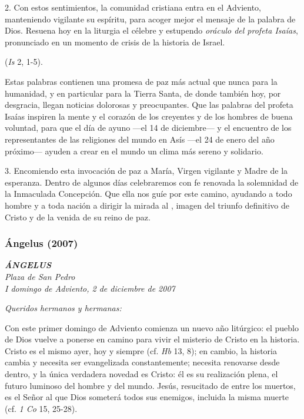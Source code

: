 2. Con estos sentimientos, la comunidad cristiana entra en el Adviento, manteniendo vigilante su espíritu, para acoger mejor el mensaje de la palabra de Dios. Resuena hoy en la liturgia el célebre y estupendo \emph{oráculo del profeta Isaías}, pronunciado en un momento de crisis de la historia de Israel.

 (\emph{Is} 2, 1-5).

Estas palabras contienen una promesa de paz más actual que nunca para la humanidad, y en particular para la Tierra Santa, de donde también hoy, por desgracia, llegan noticias dolorosas y preocupantes. Que las palabras del profeta Isaías inspiren la mente y el corazón de los creyentes y de los hombres de buena voluntad, para que el día de ayuno ---el 14 de diciembre--- y el encuentro de los representantes de las religiones del mundo en Asís ---el 24 de enero del año próximo--- ayuden a crear en el mundo un clima más sereno y solidario.

3. Encomiendo esta invocación de paz a María, Virgen vigilante y Madre de la esperanza. Dentro de algunos días celebraremos con fe renovada la solemnidad de la Inmaculada Concepción. Que ella nos guíe por este camino, ayudando a todo hombre y a toda nación a dirigir la mirada al , imagen del triunfo definitivo de Cristo y de la venida de su reino de paz.

\subsubsection{Ángelus (2007)} \emph{\textbf{ÁNGELUS}\\[2\baselineskip]Plaza de San Pedro\\ I domingo de Adviento, 2 de diciembre de 2007}

\emph{Queridos hermanos y hermanas:}

Con este primer domingo de Adviento comienza un nuevo año litúrgico: el pueblo de Dios vuelve a ponerse en camino para vivir el misterio de Cristo en la historia. Cristo es el mismo ayer, hoy y siempre (cf. \emph{Hb} 13, 8); en cambio, la historia cambia y necesita ser evangelizada constantemente; necesita renovarse desde dentro, y la única verdadera novedad es Cristo: él es su realización plena, el futuro luminoso del hombre y del mundo. Jesús, resucitado de entre los muertos, es el Señor al que Dios someterá todos sus enemigos, incluida la misma muerte (cf. \emph{1 Co} 15, 25-28).

